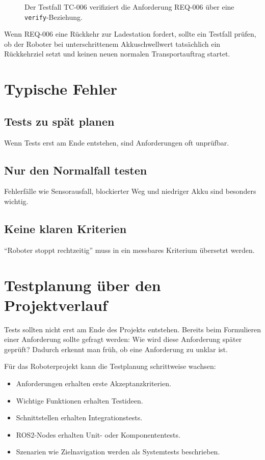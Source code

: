 \begin{figure}[H]
  \centering
  \caption{Der Testfall TC-006 verifiziert die Anforderung REQ-006 über eine \texttt{verify}-Beziehung.}
  \label{fig:kap19-verify-beziehung}
\end{figure}

\begin{praxisbox}
Wenn REQ-006 eine Rückkehr zur Ladestation fordert, sollte ein Testfall prüfen, ob der Roboter bei unterschrittenem Akkuschwellwert tatsächlich ein Rückkehrziel setzt und keinen neuen normalen Transportauftrag startet.
\end{praxisbox}

\section{Typische Fehler}
\subsection{Tests zu spät planen}
Wenn Tests erst am Ende entstehen, sind Anforderungen oft unprüfbar.

\subsection{Nur den Normalfall testen}
Fehlerfälle wie Sensorausfall, blockierter Weg und niedriger Akku sind besonders wichtig.

\subsection{Keine klaren Kriterien}
\enquote{Roboter stoppt rechtzeitig} muss in ein messbares Kriterium übersetzt werden.

\section{Testplanung über den Projektverlauf}
Tests sollten nicht erst am Ende des Projekts entstehen. Bereits beim Formulieren einer Anforderung sollte gefragt werden: Wie wird diese Anforderung später geprüft? Dadurch erkennt man früh, ob eine Anforderung zu unklar ist.

Für das Roboterprojekt kann die Testplanung schrittweise wachsen:

\begin{itemize}
    \item Anforderungen erhalten erste Akzeptanzkriterien.
    \item Wichtige Funktionen erhalten Testideen.
    \item Schnittstellen erhalten Integrationstests.
    \item ROS2-Nodes erhalten Unit- oder Komponententests.
    \item Szenarien wie Zielnavigation werden als Systemtests beschrieben.
\end{itemize}

